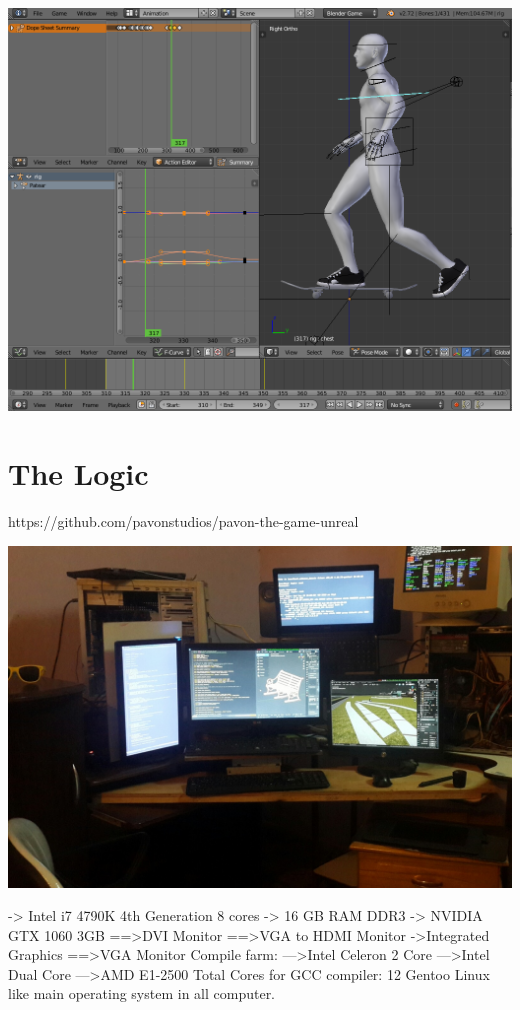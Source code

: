 \documentclass{article}
\begin{document}
  \includegraphics[width=\textwidth]{29.png}
  
  \section{The Logic}

  https://github.com/pavonstudios/pavon-the-game-unreal

  \includegraphics[width=\textwidth]{46.jpg}

  -> Intel i7 4790K 4th Generation 8 cores
-> 16 GB RAM DDR3
-> NVIDIA GTX 1060 3GB
==>DVI Monitor
==>VGA to HDMI Monitor
->Integrated Graphics
==>VGA Monitor
Compile farm:
--->Intel Celeron 2 Core
--->Intel Dual Core
--->AMD E1-2500
Total Cores for GCC compiler: 12
Gentoo Linux like main operating system in all computer.
\end{document}
